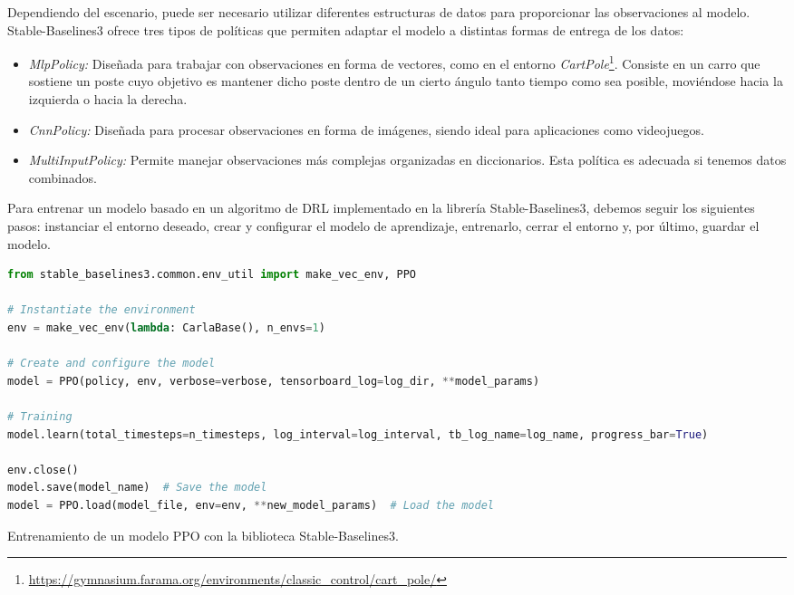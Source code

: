 Dependiendo del escenario, puede ser necesario utilizar diferentes estructuras de datos para proporcionar las observaciones al modelo. Stable-Baselines3 ofrece tres tipos de políticas que permiten adaptar el modelo a distintas formas de entrega de los datos:

\begin{itemize} 
\item \textit{MlpPolicy:} Diseñada para trabajar con observaciones en forma de vectores, como en el entorno \textit{CartPole}\footnote{\url{https://gymnasium.farama.org/environments/classic_control/cart_pole/}}. Consiste en un carro que sostiene un poste cuyo objetivo es mantener dicho poste dentro de un cierto ángulo tanto tiempo como sea posible, moviéndose hacia la izquierda o hacia la derecha. 
\item \textit{CnnPolicy:} Diseñada para procesar observaciones en forma de imágenes, siendo ideal para aplicaciones como videojuegos.
\item \textit{MultiInputPolicy:} Permite manejar observaciones más complejas organizadas en diccionarios. Esta política es adecuada si tenemos datos combinados. 
\end{itemize}

Para entrenar un modelo basado en un algoritmo de \ac{DRL} implementado en la librería Stable-Baselines3, debemos seguir los siguientes pasos: instanciar el entorno deseado, crear y configurar el modelo de aprendizaje, entrenarlo, cerrar el entorno y, por último, guardar el modelo.
\begin{code}[h] \begin{lstlisting}[language=Python] 
from stable_baselines3.common.env_util import make_vec_env, PPO

# Instantiate the environment
env = make_vec_env(lambda: CarlaBase(), n_envs=1)

# Create and configure the model
model = PPO(policy, env, verbose=verbose, tensorboard_log=log_dir, **model_params)

# Training
model.learn(total_timesteps=n_timesteps, log_interval=log_interval, tb_log_name=log_name, progress_bar=True)

env.close()
model.save(model_name)  # Save the model
model = PPO.load(model_file, env=env, **new_model_params)  # Load the model
\end{lstlisting}
\caption[Ejemplo de código con Stable-Baselines3]{Entrenamiento de un modelo \ac{PPO} con la biblioteca Stable-Baselines3.} 
\label{cod:sb3} \end{code} 

